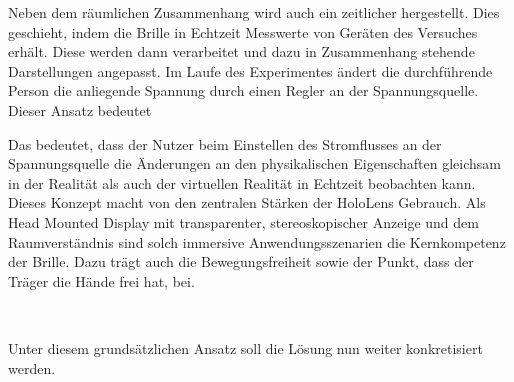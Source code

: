 Neben dem räumlichen Zusammenhang wird auch ein zeitlicher hergestellt. Dies geschieht, indem die Brille in Echtzeit Messwerte von Geräten des Versuches erhält. Diese werden dann verarbeitet und dazu in Zusammenhang stehende Darstellungen angepasst. Im Laufe des Experimentes ändert die durchführende Person die anliegende Spannung durch einen Regler an der Spannungsquelle. Dieser Ansatz bedeutet 

Das bedeutet, dass der Nutzer beim Einstellen des Stromflusses an der Spannungsquelle die Änderungen an den physikalischen Eigenschaften gleichsam in der Realität als auch der virtuellen Realität in Echtzeit beobachten kann.\\

Dieses Konzept macht von den zentralen Stärken der HoloLens Gebrauch. Als Head Mounted Display mit transparenter, stereoskopischer Anzeige und dem Raumverständnis sind solch immersive Anwendungsszenarien die Kernkompetenz der Brille. Dazu trägt auch die Bewegungsfreiheit sowie der Punkt, dass der Träger die Hände frei hat, bei.

\vspace{8px}
\begin{center}
	\\
\end{center}
\vspace{6px}


Unter diesem grundsätzlichen Ansatz soll die Lösung nun weiter konkretisiert werden.


